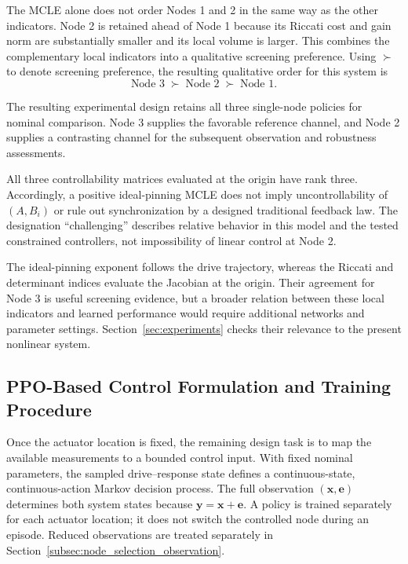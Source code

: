 \documentclass[a4paper,fleqn]{cas-dc}
\theoremstyle{plain}
\theoremstyle{definition}
\begin{document}
The MCLE alone does not order Nodes 1 and 2 in the same way as the other indicators. Node 2 is retained ahead of Node 1 because its Riccati cost and gain norm are substantially smaller and its local volume is larger. This combines the complementary local indicators into a qualitative screening preference. Using $\succ$ to denote screening preference, the resulting qualitative order for this system is
\begin{equation}
	\text{Node 3}\;\succ\;\text{Node 2}\;\succ\;\text{Node 1}.
	\label{eq:node_ranking}
\end{equation}

The resulting experimental design retains all three single-node policies for nominal comparison. Node 3 supplies the favorable reference channel, and Node 2 supplies a contrasting channel for the subsequent observation and robustness assessments.

All three controllability matrices evaluated at the origin have rank three. Accordingly, a positive ideal-pinning MCLE does not imply uncontrollability of $(A,B_i)$ or rule out synchronization by a designed traditional feedback law. The designation ``challenging'' describes relative behavior in this model and the tested constrained controllers, not impossibility of linear control at Node 2.

The ideal-pinning exponent follows the drive trajectory, whereas the Riccati and determinant indices evaluate the Jacobian at the origin. Their agreement for Node 3 is useful screening evidence, but a broader relation between these local indicators and learned performance would require additional networks and parameter settings. Section~\ref{sec:experiments} checks their relevance to the present nonlinear system.

\subsection{PPO-Based Control Formulation and Training Procedure}
\label{subsec:ppo_control_framework}

Once the actuator location is fixed, the remaining design task is to map the available measurements to a bounded control input. With fixed nominal parameters, the sampled drive--response state defines a continuous-state, continuous-action Markov decision process. The full observation $(\mathbf x,\mathbf e)$ determines both system states because $\mathbf y=\mathbf x+\mathbf e$. A policy is trained separately for each actuator location; it does not switch the controlled node during an episode. Reduced observations are treated separately in Section~\ref{subsec:node_selection_observation}.
\end{document}
